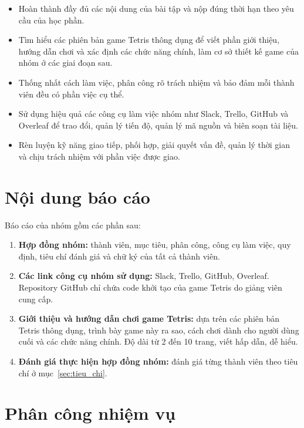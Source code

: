 \documentclass[12pt,a4paper,oneside]{report}
\begin{document}
\begin{itemize}
    \item Hoàn thành đầy đủ các nội dung của bài tập và nộp đúng thời hạn theo yêu cầu của học phần.
    \item Tìm hiểu các phiên bản game Tetris thông dụng để viết phần giới thiệu, hướng dẫn chơi và xác định các chức năng chính, làm cơ sở thiết kế game của nhóm ở các giai đoạn sau.
    \item Thống nhất cách làm việc, phân công rõ trách nhiệm và bảo đảm mỗi thành viên đều có phần việc cụ thể.
    \item Sử dụng hiệu quả các công cụ làm việc nhóm như Slack, Trello, GitHub và Overleaf để trao đổi, quản lý tiến độ, quản lý mã nguồn và biên soạn tài liệu.
    \item Rèn luyện kỹ năng giao tiếp, phối hợp, giải quyết vấn đề, quản lý thời gian và chịu trách nhiệm với phần việc được giao.
\end{itemize}

\section{Nội dung báo cáo}

Báo cáo của nhóm gồm các phần sau:
\begin{enumerate}[leftmargin=1.5cm]
    \item \textbf{Hợp đồng nhóm:} thành viên, mục tiêu, phân công, công cụ làm việc, quy định, tiêu chí đánh giá và chữ ký của tất cả thành viên.
    \item \textbf{Các link công cụ nhóm sử dụng:} Slack, Trello, GitHub, Overleaf. Repository GitHub chỉ chứa code khởi tạo của game Tetris do giảng viên cung cấp.
    \item \textbf{Giới thiệu và hướng dẫn chơi game Tetris:} dựa trên các phiên bản Tetris thông dụng, trình bày game này ra sao, cách chơi dành cho người dùng cuối và các chức năng chính. Độ dài từ 2 đến 10 trang, viết hấp dẫn, dễ hiểu.
    \item \textbf{Đánh giá thực hiện hợp đồng nhóm:} đánh giá từng thành viên theo tiêu chí ở mục~\ref{sec:tieu_chi}.
\end{enumerate}

\section{Phân công nhiệm vụ}
\end{document}
